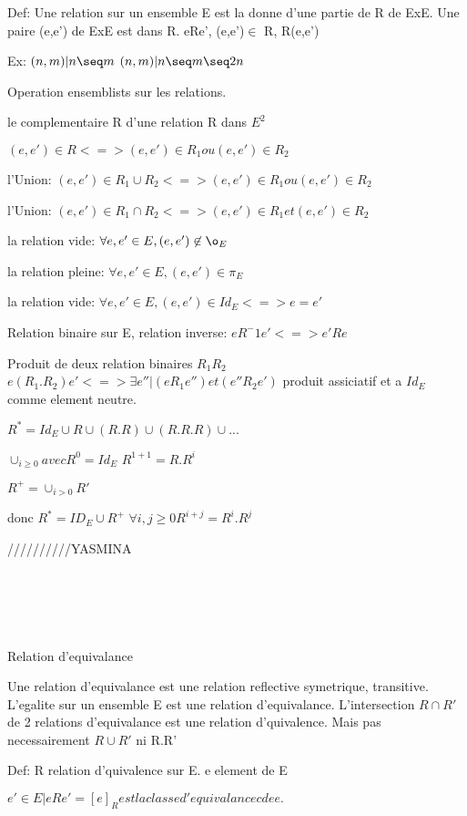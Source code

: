 \documentclass{article}
\begin{document}
Def: Une relation sur un ensemble E est la donne d'une partie de R de ExE.
Une paire (e,e') de ExE est dans R. eRe', (e,e')$\in$ R, R(e,e')

Ex: ${(n,m)|n \seq m}$
${(n,m)|n \seq m \seq 2n}$

Operation ensemblists sur les relations.

le complementaire R d'une relation R dans $E^2$

$(e,e') \in R <=> (e,e') \in R_1 ou (e,e') \in R_2$


l'Union:
$(e,e') \in R_1 \cup R_2 <=> (e,e') \in R_1 ou (e,e') \in R_2 $

l'Union:
$(e,e') \in R_1 \cap R_2 <=> (e,e') \in R_1 et (e,e') \in R_2 $

la relation vide:
$ \forall e,e' \in E, (e,e') \not\in \o_E $

la relation pleine:
$ \forall e,e' \in E, (e,e') \in \pi_E $

la relation vide:
$ \forall e,e' \in E, (e,e') \in Id_E <=> e = e' $


Relation binaire sur E,
relation inverse:
$ eR^-1e' <=> e'Re $

Produit de deux relation binaires $R_1R_2$
$ e(R_1.R_2)e' <=> \exists e'' | (eR_1e'') et (e''R_2e') $
produit assiciatif et a $Id_E$ comme element neutre.

$ R^* = Id_E \cup R \cup (R.R) \cup (R.R.R) \cup ... $

$ \cup_{i\geq0} avec R^0 = Id_E$
$R^{1+1} = R.R^i$


$R^+ = \cup_{i>0} R'$

donc $R^* = ID_E \cup R^+$
$ \forall i, j \geq 0 R^{i+j}=R^i.R^j $


//////////YASMINA\\\\\\\\\\\\


Relation d'equivalance

Une relation d'equivalance est une relation reflective symetrique, transitive.
L'egalite sur un ensemble E est une relation d'equivalance.
L'intersection $R \cap R'$ de 2 relations d'equivalance est une relation d'quivalence. Mais pas necessairement $ R \cup R' $ ni R.R'

Def: R relation d'quivalence sur E. e element de E

$ {e' \in E | eRe'} = [e]_R est la classe d'equivalancec de e. $
\end{document}

